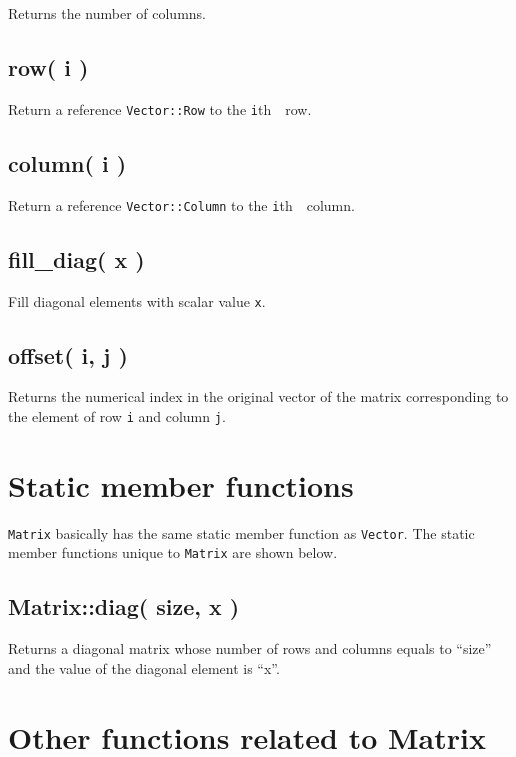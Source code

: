 \documentclass[]{book}
\theoremstyle{definition}
\theoremstyle{definition}
\theoremstyle{remark}
\begin{document}
Returns the number of columns.

\subsection{row( i )}\label{row-i}

Return a reference \texttt{Vector::Row} to the \texttt{i}th　row.

\subsection{column( i )}\label{column-i}

Return a reference \texttt{Vector::Column} to the \texttt{i}th　column.

\subsection{fill\_diag( x )}\label{fill_diag-x}

Fill diagonal elements with scalar value \texttt{x}.

\subsection{offset( i, j )}\label{offset-i-j}

Returns the numerical index in the original vector of the matrix
corresponding to the element of row \texttt{i} and column \texttt{j}.

\section{Static member functions}\label{static-member-functions-1}

\texttt{Matrix} basically has the same static member function as
\texttt{Vector}. The static member functions unique to \texttt{Matrix}
are shown below.

\subsection{Matrix::diag( size, x )}\label{matrixdiag-size-x}

Returns a diagonal matrix whose number of rows and columns equals to
``size'' and the value of the diagonal element is ``x''.

\section{Other functions related to
Matrix}\label{other-functions-related-to-matrix}
\end{document}
